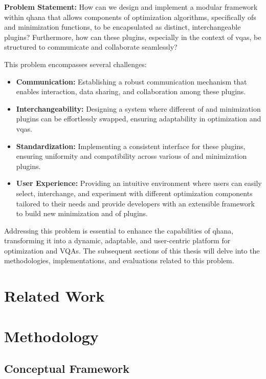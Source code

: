 \documentclass[
  a4paper,  %
  twoside,  %
  bibliography=totoc,
  headsepline,
  cleardoublepage=empty,
  parskip=half,
  draft=false
]{scrbook}
\begin{document}
\textbf{Problem Statement:}
How can we design and implement a modular framework within \gls{qhana} that allows components of optimization algorithms, specifically \glspl{of} and minimization functions, to be encapsulated as distinct, interchangeable plugins?
Furthermore, how can these plugins, especially in the context of \glspl{vqa}, be structured to communicate and collaborate seamlessly?

This problem encompasses several challenges:

\begin{itemize}
    \item \textbf{Communication:} Establishing a robust communication mechanism that enables interaction, data sharing, and collaboration among these plugins.
    \item \textbf{Interchangeability:} Designing a system where different \gls{of} and minimization plugins can be effortlessly swapped, ensuring adaptability in optimization and \glspl{vqa}.
    \item \textbf{Standardization:} Implementing a consistent interface for these plugins, ensuring uniformity and compatibility across various \gls{of} and minimization plugins.
    \item \textbf{User Experience:} Providing an intuitive environment where users can easily select, interchange, and experiment with different optimization components tailored to their needs and provide developers with an extensible framework to build new minimization and \gls{of} plugins.
\end{itemize}

Addressing this problem is essential to enhance the capabilities of \gls{qhana}, transforming it into a dynamic, adaptable, and user-centric platform for optimization and VQAs.
The subsequent sections of this thesis will delve into the methodologies, implementations, and evaluations related to this problem.

\chapter{Related Work}

\cite{Beisel2023} \cite{Beisel2023a} \cite{Thullier2021}

\chapter{Methodology}
\label{chap:methodology}
\section{Conceptual Framework}
\label{sec:conceptualFramework}
\end{document}
